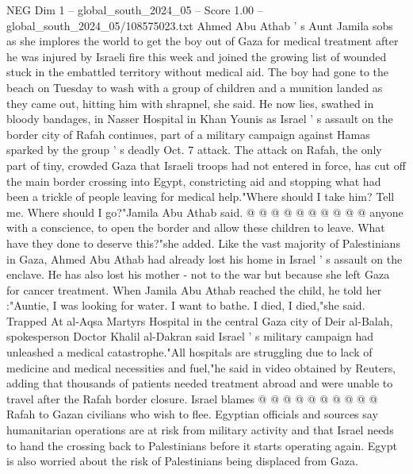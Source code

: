 \begin{textsample}{NEG Dim 1 – global\_south\_2024\_05 – Score 1.00 – global\_south\_2024\_05/108575023.txt}  \label{ex:f1_neg_211}
Ahmed Abu Athab ' s Aunt Jamila sobs as she implores the world to get the boy out of Gaza for medical treatment after he was injured by Israeli fire this week and joined the growing list of wounded stuck in the embattled territory without medical aid.
The boy had gone to the beach on Tuesday to wash with a group of children and a munition landed as they came out, hitting him with shrapnel, she said.
He now lies, swathed in bloody bandages, in Nasser Hospital in Khan Younis as Israel ' s assault on the border city of Rafah continues, part of a military campaign against Hamas sparked by the group ' s deadly Oct. 7 attack.
The attack on Rafah, the only part of tiny, crowded Gaza that Israeli troops had not entered in force, has cut off the main border crossing into Egypt, constricting aid and stopping what had been a trickle of people leaving for medical help."Where should I take him?
Tell me.
Where should I go?"Jamila Abu Athab said. @ @ @ @ @ @ @ @ @ @ anyone with a conscience, to open the border and allow these children to leave.
What have they done to deserve this?"she added.
Like the vast majority of Palestinians in Gaza, Ahmed Abu Athab had already lost his home in Israel ' s assault on the enclave.
He has also lost his mother - not to the war but because she left Gaza for cancer treatment.
When Jamila Abu Athab reached the child, he told her :"Auntie, I was looking for water.
I want to bathe.
I died, I died,"she said.
Trapped At al-Aqsa Martyrs Hospital in the central Gaza city of Deir al-Balah, spokesperson Doctor Khalil al-Dakran said Israel ' s military campaign had unleashed a medical catastrophe."All hospitals are struggling due to lack of medicine and medical necessities and fuel,"he said in video obtained by Reuters, adding that thousands of patients needed treatment abroad and were unable to travel after the Rafah border closure.
Israel blames @ @ @ @ @ @ @ @ @ @ Rafah to Gazan civilians who wish to flee.
Egyptian officials and sources say humanitarian operations are at risk from military activity and that Israel needs to hand the crossing back to Palestinians before it starts operating again.
Egypt is also worried about the risk of Palestinians being displaced from Gaza.

\end{textsample}

